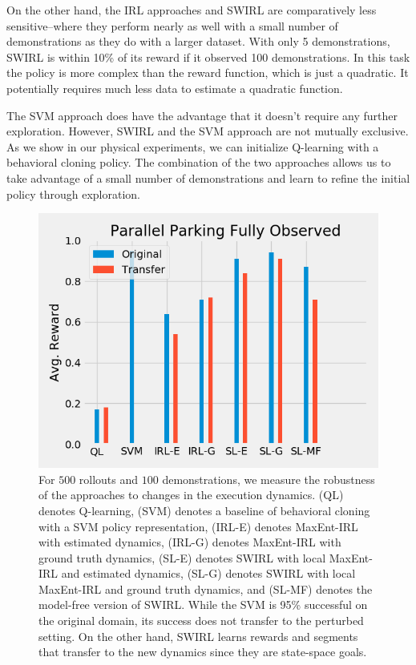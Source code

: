 On the other hand, the IRL approaches and SWIRL are comparatively less sensitive--where they perform nearly as well with a small number of demonstrations as they do with a larger dataset.
With only 5 demonstrations, SWIRL is within 10\% of its reward if it observed 100 demonstrations.
In this task the policy is more complex than the reward function, which is just a quadratic.
It potentially requires much less data to estimate a quadratic function.

The SVM approach does have the advantage that it doesn't require any further exploration.
However, SWIRL and the SVM approach are not mutually exclusive. 
As we show in our physical experiments, we can initialize Q-learning with a behavioral cloning policy. 
The combination of the two approaches allows us to take advantage of a small number of demonstrations and learn to refine the initial policy through exploration.


\begin{figure}[t]
\centering
 \includegraphics[width=\columnwidth]{new-exp/pp-fo3.png}
 \caption{For $500$ rollouts  and $100$ demonstrations, we measure the robustness of the approaches to changes in the execution dynamics. (QL) denotes Q-learning, (SVM) denotes a baseline of behavioral cloning with a SVM policy representation, (IRL-E) denotes MaxEnt-IRL with estimated dynamics, (IRL-G) denotes MaxEnt-IRL with ground truth dynamics, (SL-E) denotes SWIRL with local MaxEnt-IRL and estimated dynamics, (SL-G) denotes SWIRL with local MaxEnt-IRL and ground truth dynamics, and (SL-MF) denotes the model-free version of SWIRL. While the SVM is 95\% successful on the original domain, its success does not transfer to the perturbed setting. On the other hand, SWIRL learns rewards and segments that transfer to the new dynamics since they are state-space goals. \label{exp:pp-fo3}}
\end{figure}

